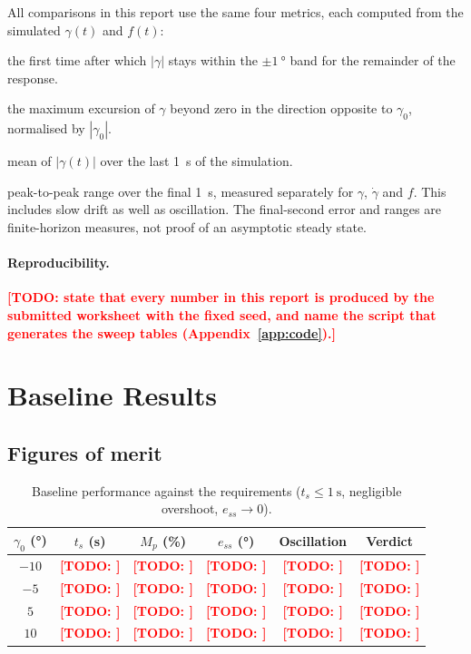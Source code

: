 \documentclass[11pt,a4paper]{article}
\newcommand{\todo}[1]{\textcolor{red}{\textbf{[TODO: #1]}}}
\newcommand{\gam}{\ensuremath{\gamma}}
\newcommand{\gamdot}{\ensuremath{\dot{\gamma}}}
\newcommand{\ts}{\ensuremath{t_s}}
\newcommand{\overshoot}{\ensuremath{M_p}}
\newcommand{\sse}{\ensuremath{e_{ss}}}
\begin{document}
All comparisons in this report use the same four metrics, each computed from
the simulated $\gam(t)$ and $f(t)$:
\begin{description}[leftmargin=*,style=nextline]
  \item[Settling time $\ts$] the first time after which $|\gam|$ stays within
        the $\pm\SI{1}{\degree}$ band for the remainder of the response.
  \item[Overshoot $\overshoot$] the maximum excursion of $\gam$ beyond zero in
        the direction opposite to $\gam_0$, normalised by $|\gam_0|$.
  \item[Steady-state error $\sse$] mean of $|\gam(t)|$ over the last
        \SI{1}{\s} of the simulation.
  \item[Late-time variation] peak-to-peak range over the final \SI{1}{\s},
        measured separately for $\gam$, $\gamdot$ and $f$. This includes slow
        drift as well as oscillation. The final-second error and ranges are
        finite-horizon measures, not proof of an asymptotic steady state.
\end{description}

\paragraph{Reproducibility.}
\todo{state that every number in this report is produced by the submitted
worksheet with the fixed seed, and name the script that generates the sweep
tables (Appendix~\ref{app:code}).}

\section{Baseline Results}
\label{sec:baseline}

\subsection{Figures of merit}
\label{sec:baseline-metrics}

\begin{table}[H]
\centering
\small
\begin{tabular}{@{}cccccc@{}}
\toprule
$\gam_0$ (\si{\degree}) & $\ts$ (\si{\s}) & $\overshoot$ (\si{\%}) & $\sse$ (\si{\degree}) & Oscillation & Verdict \\
\midrule
$-10$ & \todo{} & \todo{} & \todo{} & \todo{} & \todo{} \\
$-5$  & \todo{} & \todo{} & \todo{} & \todo{} & \todo{} \\
$5$   & \todo{} & \todo{} & \todo{} & \todo{} & \todo{} \\
$10$  & \todo{} & \todo{} & \todo{} & \todo{} & \todo{} \\
\bottomrule
\end{tabular}
\caption{Baseline performance against the requirements ($\ts \le \SI{1}{\s}$,
negligible overshoot, $\sse \to 0$).}
\label{tab:baseline}
\end{table}
\end{document}
